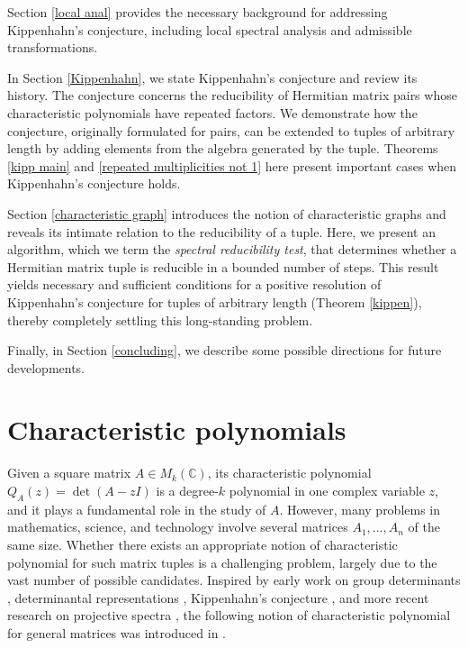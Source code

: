 \documentclass[draft, 12pt, reqno]{amsart}
\newcommand{\C}{{\mathbb C}}
\numberwithin{equation}{section}
\theoremstyle{plain}
\begin{document}
Section \ref{local anal} provides the necessary background for addressing Kippenhahn's conjecture, including local spectral analysis and admissible transformations.

In Section \ref{Kippenhahn}, we state Kippenhahn's conjecture and review its history. The conjecture concerns the reducibility of Hermitian matrix pairs whose characteristic polynomials have repeated factors. We demonstrate how the conjecture, originally formulated for pairs, can be extended to tuples of arbitrary length by adding elements from the algebra generated by the tuple. Theorems \ref{kipp main} and \ref{repeated multiplicities not 1} here present important cases when Kippenhahn's conjecture holds.  

Section \ref{characteristic graph} introduces the notion of characteristic graphs and reveals its intimate relation to the reducibility of a tuple. Here, we present an algorithm, which we term the \textit{spectral reducibility test}, that determines whether a Hermitian matrix tuple is reducible in a bounded number of steps. This result yields necessary and sufficient conditions for a positive resolution of Kippenhahn's conjecture for tuples of arbitrary length (Theorem \ref{kippen}), thereby completely settling this long-standing problem.

Finally, in Section \ref{concluding}, we describe some possible directions for future developments.



\section{Characteristic polynomials}\label{characteristic pol}

Given a square matrix $A\in M_k(\C)$, its characteristic polynomial $Q_A(z)=\det (A-zI)$ is a degree-$k$ polynomial in one complex variable $z$, and it plays a fundamental role in the study of $A$. However, many problems in mathematics, science, and technology involve several matrices $A_1, ..., A_n$ of the same size. Whether there exists an appropriate notion of characteristic polynomial for such matrix tuples is a challenging problem, largely due to the vast number of possible candidates. Inspired by early work on group determinants \cite{Di75,Fr}, determinantal representations \cite{Di21,HV}, Kippenhahn's conjecture \cite{Ki,La,Law,LSS,Sh1}, and more recent research on projective spectra \cite{Ya09}, the following notion of characteristic polynomial for general matrices was introduced in \cite{CSZ}.
\end{document}
